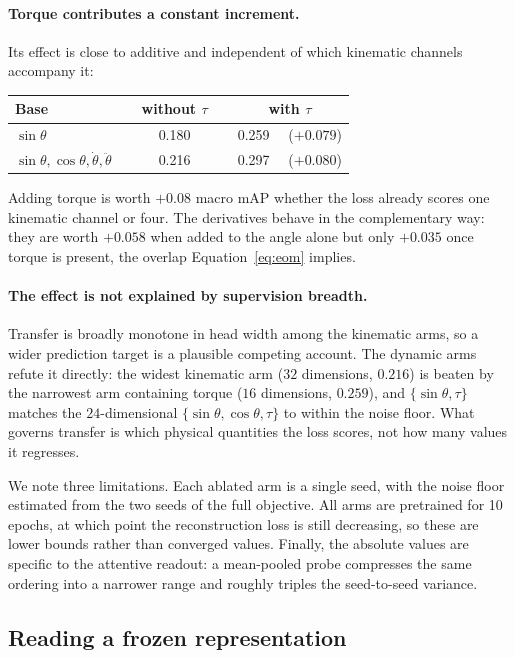 \paragraph{Torque contributes a constant increment.} Its effect is close to additive and
independent of which kinematic channels accompany it:
\begin{center}
\begin{tabular}{lcc}
\toprule
Base & \ \ without $\tau$\ \  & \ \ with $\tau$\ \  \\
\midrule
$\sin\theta$                                   & 0.180 & 0.259 \ \ ($+0.079$) \\
$\sin\theta,\cos\theta,\dot\theta,\ddot\theta$ & 0.216 & 0.297 \ \ ($+0.080$) \\
\bottomrule
\end{tabular}
\end{center}
Adding torque is worth $+0.08$ macro mAP whether the loss already scores one kinematic
channel or four. The derivatives behave in the complementary way: they are worth
$+0.058$ when added to the angle alone but only $+0.035$ once torque is present, the
overlap Equation~\ref{eq:eom} implies.

\paragraph{The effect is not explained by supervision breadth.} Transfer is broadly
monotone in head width among the kinematic arms, so a wider prediction target is a
plausible competing account. The dynamic arms refute it directly: the widest kinematic
arm ($32$ dimensions, $0.216$) is beaten by the narrowest arm containing torque ($16$
dimensions, $0.259$), and $\{\sin\theta,\tau\}$ matches the $24$-dimensional
$\{\sin\theta,\cos\theta,\tau\}$ to within the noise floor. What governs transfer is
which physical quantities the loss scores, not how many values it regresses.

We note three limitations. Each ablated arm is a single seed, with the noise floor
estimated from the two seeds of the full objective. All arms are pretrained for 10
epochs, at which point the reconstruction loss is still decreasing, so these are lower
bounds rather than converged values. Finally, the absolute values are specific to the
attentive readout: a mean-pooled probe compresses the same ordering into a narrower
range and roughly triples the seed-to-seed variance.

\subsection{Reading a frozen representation}
\label{sec:pooling}

